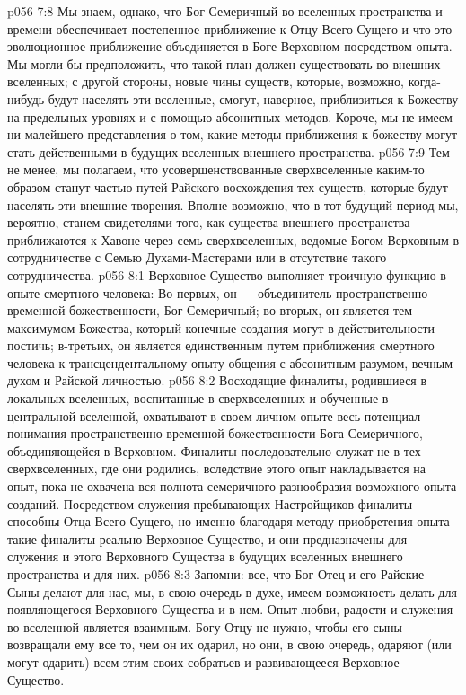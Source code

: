 \vs p056 7:8 Мы знаем, однако, что Бог Семеричный во вселенных пространства и времени обеспечивает постепенное приближение к Отцу Всего Сущего и что это эволюционное приближение объединяется в Боге Верховном посредством опыта. Мы могли бы предположить, что такой план должен существовать во внешних вселенных; с другой стороны, новые чины существ, которые, возможно, когда\hyp{}нибудь будут населять эти вселенные, смогут, наверное, приблизиться к Божеству на предельных уровнях и с помощью абсонитных методов. Короче, мы не имеем ни малейшего представления о том, какие методы приближения к божеству могут стать действенными в будущих вселенных внешнего пространства.
\vs p056 7:9 Тем не менее, мы полагаем, что усовершенствованные сверхвселенные каким\hyp{}то образом станут частью путей Райского восхождения тех существ, которые будут населять эти внешние творения. Вполне возможно, что в тот будущий период мы, вероятно, станем свидетелями того, как существа внешнего пространства приближаются к Хавоне через семь сверхвселенных, ведомые Богом Верховным в сотрудничестве с Семью Духами\hyp{}Мастерами или в отсутствие такого сотрудничества.
\vs p056 8:1 Верховное Существо выполняет троичную функцию в опыте смертного человека: Во\hyp{}первых, он --- объединитель пространственно\hyp{}временной божественности, Бог Семеричный; во\hyp{}вторых, он является тем максимумом Божества, который конечные создания могут в действительности постичь; в\hyp{}третьих, он является единственным путем приближения смертного человека к трансцендентальному опыту общения с абсонитным разумом, вечным духом и Райской личностью.
\vs p056 8:2 Восходящие финалиты, родившиеся в локальных вселенных, воспитанные в сверхвселенных и обученные в центральной вселенной, охватывают в своем личном опыте весь потенциал понимания пространственно\hyp{}временной божественности Бога Семеричного, объединяющейся в Верховном. Финалиты последовательно служат не в тех сверхвселенных, где они родились, вследствие этого опыт накладывается на опыт, пока не охвачена вся полнота семеричного разнообразия возможного опыта созданий. Посредством служения пребывающих Настройщиков финалиты способны  Отца Всего Сущего, но именно благодаря методу приобретения опыта такие финалиты реально  Верховное Существо, и они предназначены для служения и  этого Верховного Существа в будущих вселенных внешнего пространства и для них.
\vs p056 8:3 Запомни: все, что Бог\hyp{}Отец и его Райские Сыны делают для нас, мы, в свою очередь в духе, имеем возможность делать для появляющегося Верховного Существа и в нем. Опыт любви, радости и служения во вселенной является взаимным. Богу Отцу не нужно, чтобы его сыны возвращали ему все то, чем он их одарил, но они, в свою очередь, одаряют (или могут одарить) всем этим своих собратьев и развивающееся Верховное Существо.
